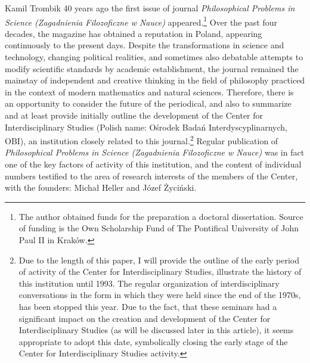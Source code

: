 \begin{artengenv}{Kamil Trombik}
\lettrine[loversize=0.13,lines=2,lraise=-0.05,nindent=3pt,findent=0.2pt]%
{40}{} years ago the first issue of journal \textit{Philosophical Problems in Science
(Zagadnienia Filozoficzne w Nauce)} appeared.\footnote{The author obtained funds for the
preparation a doctoral dissertation. Source of funding is the Own Scholarship Fund of The Pontifical University of John
Paul II in Kraków.} Over the past four decades, the magazine has obtained a reputation in Poland,
appearing continuously to the present days. Despite the transformations in science and technology, changing political
realities, and sometimes also debatable attempts to modify scientific standards by academic establishment, the journal
remained the mainstay of independent and creative thinking in the field of philosophy practiced in the context of
modern mathematics and natural sciences. Therefore, there is an opportunity to consider the future of the periodical,
and also to summarize and at least provide initially outline the development of the Center for Interdisciplinary
Studies (Polish name: Ośrodek Badań Interdyscyplinarnych, OBI), an institution closely related to this
journal.\footnote{Due to the length of this paper, I will provide the outline of the early period of activity of the
Center for Interdisciplinary Studies, illustrate the history of this institution until 1993. The regular organization
of interdisciplinary conversations in the form in which they were held since the end of the 1970s, has been stopped
this year. Due to the fact, that these seminars had a significant impact on the creation and development of the Center
for Interdisciplinary Studies (as will be discussed later in this article), it seems appropriate to adopt this date,
symbolically closing the early stage of the Center for Interdisciplinary Studies activity.} Regular
publication of \textit{Philosophical Problems in Science (Zagadnienia Filozoficzne w
Nauce)} was in fact one of the key factors of activity of this institution, and the content of
individual numbers testified to the area of research interests of the members of the Center, with the founders: Michał
Heller and Józef Życiński.


\end{artengenv}

